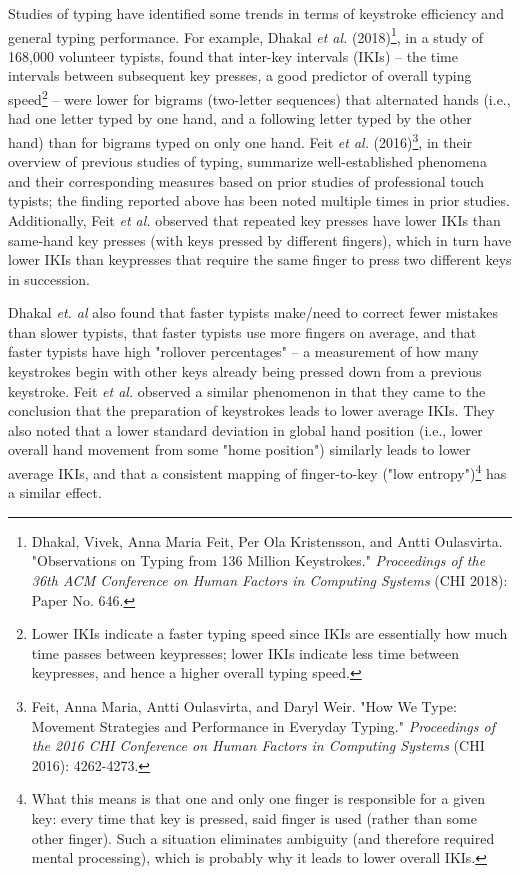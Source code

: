 \documentclass[11pt]{article}
\begin{document}
Studies of typing have identified some trends in terms of keystroke efficiency and general typing performance. For example, Dhakal \emph{et al.} (2018)\footnote{Dhakal, Vivek, Anna Maria Feit, Per Ola Kristensson, and Antti Oulasvirta. "Observations on Typing from 136 Million Keystrokes." \emph{Proceedings of the 36th ACM Conference on Human Factors in Computing Systems} (CHI 2018): Paper No. 646.}, in a study of 168,000 volunteer typists, found that inter-key intervals (IKIs) -- the time intervals between subsequent key presses, a good predictor of overall typing speed\footnote{Lower IKIs indicate a faster typing speed since IKIs are essentially how much time passes between keypresses; lower IKIs indicate less time between keypresses, and hence a higher overall typing speed.} -- were lower for bigrams (two-letter sequences) that alternated hands (i.e., had one letter typed by one hand, and a following letter typed by the other hand) than for bigrams typed on only one hand. Feit \emph{et al.} (2016)\footnote{Feit, Anna Maria, Antti Oulasvirta, and Daryl Weir. "How We Type: Movement Strategies and Performance in Everyday Typing." \emph{Proceedings of the 2016 CHI Conference on Human Factors in Computing Systems} (CHI 2016): 4262-4273.}, in their overview of previous studies of typing, summarize well-established phenomena and their corresponding measures based on prior studies of professional touch typists; the finding reported above has been noted multiple times in prior studies. Additionally, Feit \emph{et al.} observed that repeated key presses have lower IKIs than same-hand key presses (with keys pressed by different fingers), which in turn have lower IKIs than keypresses that require the same finger to press two different keys in succession.

Dhakal \emph{et. al} also found that faster typists make/need to correct fewer mistakes than slower typists, that faster typists use more fingers on average, and that faster typists have high "rollover percentages" -- a measurement of how many keystrokes begin with other keys already being pressed down from a previous keystroke. Feit \emph{et al.} observed a similar phenomenon in that they came to the conclusion that the preparation of keystrokes leads to lower average IKIs. They also noted that a lower standard deviation in global hand position (i.e., lower overall hand movement from some "home position") similarly leads to lower average IKIs, and that a consistent mapping of finger-to-key ("low entropy")\footnote{What this means is that one and only one finger is responsible for a given key: every time that key is pressed, said finger is used (rather than some other finger). Such a situation eliminates ambiguity (and therefore required mental processing), which is probably why it leads to lower overall IKIs.} has a similar effect.
\end{document}
